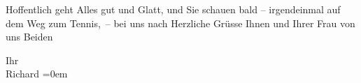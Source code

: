 \pstart
           Hoffentlich geht Alles gut und Glatt, und Sie schauen bald – irgendeinmal auf dem Weg
               zum {\pb}Tennis, – bei uns nach
               Herzliche Grüsse Ihnen und Ihrer Frau von uns Beiden\pend
           
\pstart
           Ihr{\\[\baselineskip]}\spacefill\mbox{Richard}\pend
           \leftskip=0em{}\endnumbering{}  \newcommand{\dateiname}{L01878}\newcommand{\titel}{Richard Beer-Hofmann an Arthur Schnitzler, 21. 9. 1909}\newcommand{\editorInnen}{Martin Anton Müller und Gerd-Hermann Susen}
